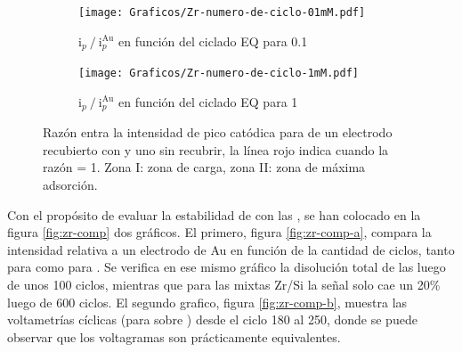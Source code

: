 		 			\begin{figure}[th]
			   	    \begin{subfigure}[t]{0.495\textwidth}
			        	\texttt{[image: Graficos/Zr-numero-de-ciclo-01mM.pdf]}
			        	\vspace*{-6mm}\caption{$\text{i}_p\mathbin{/}\text{i}_p^{\text{Au}}$ en función del ciclado EQ para \ru\space \SI{0.1}{\milli\Molar}}
			         	\end{subfigure}
			     		 \begin{subfigure}[t]{0.495\textwidth}
			        	\texttt{[image: Graficos/Zr-numero-de-ciclo-1mM.pdf]}
			        	\vspace*{-6mm	}\caption{$\text{i}_p\mathbin{/}\text{i}_p^{\text{Au}}$ en función del ciclado EQ para \ru\space \SI{1}{\milli\Molar}}
			         	\end{subfigure}
			         	\caption[Intensidad en función del ciclado EQ para \pdmZ]{Razón entra la intensidad de pico catódica para \ru\space de un electrodo recubierto con \pdmZ\space y uno sin recubrir, la línea rojo indica cuando la razón = 1. Zona I: zona de carga, zona II: zona de máxima adsorción.}
			         	\label{fig:ventana-zr}
			     	\end{figure}
			     		
		 Con el propósito de evaluar la estabilidad de \pdmZ\space con las \pdmF, se han colocado en la figura \ref{fig:zr-comp} dos gráficos. El primero, figura \ref{fig:zr-comp-a}, compara la intensidad relativa a un electrodo de Au en función de la cantidad de ciclos, tanto para \pdmZ\space como para \pdmF. Se verifica en ese mismo gráfico la disolución total de las \pdmF\space luego de unos 100 ciclos, mientras que para las mixtas Zr/Si la señal solo cae un 20\% luego de 600 ciclos. El segundo grafico, figura \ref{fig:zr-comp-b}, muestra las voltametrías cíclicas (para \ru\space sobre \pdmZ) desde el ciclo 180 al 250, donde se puede observar que los voltagramas son prácticamente equivalentes.

